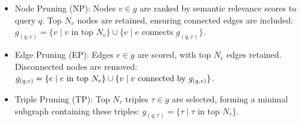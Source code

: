 {%

\begin{itemize}[leftmargin=10pt]
\item 
{ Node Pruning (NP):} Nodes $v \in g$ 
are ranked by semantic relevance scores to query $q$. Top $N_v$ nodes are retained, ensuring connected edges are included:  $    g_{(q, v)}= \{v \mid v \text{ in top } N_v\} \cup \{e \mid e \text{ connects } g_{(q, v)}\}$.
\item 
{Edge Pruning (EP):} Edges $e \in g$ are scored, with top $N_e$ edges retained. Disconnected nodes are removed: $g_{(q, e)} = \{e \mid e \text{ in top } N_e\} \\ \cup \{v \mid v \text{ connected by } g_{(q, e)}\}$.
\item 
{Triple Pruning (TP):} 
Top $N_\tau$ triples $\tau \in g$ are selected, forming a minimal subgraph containing these triples: 
$g_{(q, \tau)} = \{\tau \mid \tau \text{ in top } N_\tau\}$.


\end{itemize}}
